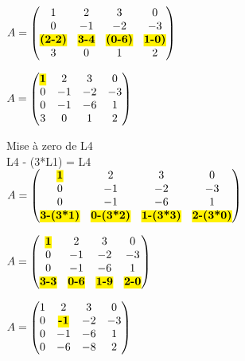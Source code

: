 \vspace{5mm} %

$
A =
\begin{pmatrix}
  1 & 2 & 3 & 0 \\
  0 & -1 & -2 & -3 \\
  \hl{\textbf{(2-2)}} & \hl{\textbf{3-4}} & \hl{\textbf{(0-6)}} & \hl{\textbf{1-0)}} \\
  3 & 0 & 1 & 2 \\
\end{pmatrix}
$

\vspace{5mm} %

$
A =
\begin{pmatrix}
  \hl{\textbf{1}} & 2 & 3 & 0 \\
  0 & -1 & -2 & -3 \\
  0 & -1 & -6 & 1 \\
  3 & 0 & 1 & 2 \\
\end{pmatrix}
$

\vspace{10mm} %

Mise à zero de L4 \\
L4 - (3*L1) = L4 \\

$
A =
\begin{pmatrix}
  \hl{\textbf{1}} & 2 & 3 & 0 \\
  0 & -1 & -2 & -3 \\
  0 & -1 & -6 & 1 \\
  \hl{\textbf{3-(3*1)}} & \hl{\textbf{0-(3*2)}} & \hl{\textbf{1-(3*3)}} & \hl{\textbf{2-(3*0)}} \\
\end{pmatrix}
$

\vspace{5mm} %

$
A =
\begin{pmatrix}
  \hl{\textbf{1}} & 2 & 3 & 0 \\
  0 & -1 & -2 & -3 \\
  0 & -1 & -6 & 1 \\
  \hl{\textbf{3-3}} & \hl{\textbf{0-6}} & \hl{\textbf{1-9}} & \hl{\textbf{2-0}} \\
\end{pmatrix}
$

\vspace{5mm} %

$
A =
\begin{pmatrix}
  1 & 2 & 3 & 0   \\
  0 & \hl{\textbf{-1}} & -2 & -3   \\
  0 & -1 & -6 & 1 \\
  0 & -6 & -8 & 2 \\
\end{pmatrix}
$

